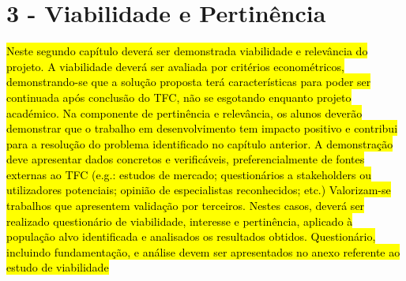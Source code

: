 \chapter*{3 - Viabilidade e Pertinência}

\hl{Neste segundo capítulo deverá ser demonstrada viabilidade e relevância do projeto. A viabilidade deverá ser avaliada por critérios econométricos, demonstrando-se que a solução proposta terá características para poder ser continuada após conclusão do TFC, não se esgotando enquanto projeto académico. 
Na componente de pertinência e relevância, os alunos deverão demonstrar que o trabalho em desenvolvimento tem impacto positivo e contribui para a resolução do problema identificado no capítulo anterior. A demonstração deve apresentar dados concretos e verificáveis, preferencialmente de fontes externas ao TFC (e.g.: estudos de mercado; questionários a stakeholders ou utilizadores potenciais; opinião de especialistas reconhecidos; etc.) 
Valorizam-se trabalhos que apresentem validação por terceiros. Nestes casos, deverá ser realizado questionário de viabilidade, interesse e pertinência, aplicado à população alvo identificada e analisados os resultados obtidos. Questionário, incluindo fundamentação, e análise devem ser apresentados no anexo referente ao estudo de viabilidade}
